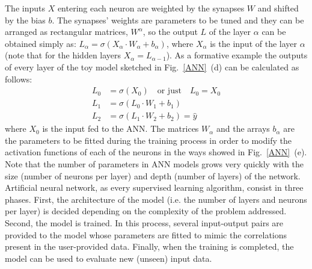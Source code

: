 The inputs $X$ entering each neuron are weighted by the synapses $W$ and shifted
by the bias $b$. The synapses' weights are parameters to be tuned and they can be
arranged as rectangular matrices, $W^{\alpha}$, so the output
$L$ of the layer $\alpha$ can be obtained simply as:
$L_\alpha=\sigma(X_\alpha\cdot W_\alpha + b_\alpha)$,
where $X_\alpha$ is the input of the layer $\alpha$ (note that for the hidden
layers $X_\alpha=L_{\alpha-1}$).
As a formative example the outputs of every layer of the toy model sketched in
Fig.~\ref{ANN}~(d) can be calculated as follows:
\begin{equation}
  \begin{split}
    L_0 &= \sigma(X_0) \quad\text{or just}\quad L_0 = X_0 \\
    L_1 &= \sigma\left(L_0 \cdot W_1 + b_1\right) \\
    L_2 &= \sigma\left(L_1\cdot W_2 + b_2\right)= \hat{y}
  \end{split}
\label{FF}
\end{equation}
where $X_0$ is the input fed to the ANN.
The matrices $W_\alpha$ and the arrays $b_\alpha$ are the parameters to be
fitted during the training process in order to modify the activation functions
of each of the neurons in the ways showed in Fig.~\ref{ANN}~(e). Note that the
number of parameters in ANN models grows very quickly with the size (number of
neurons per layer) and depth (number of layers) of the network.\\


Artificial neural network, as every supervised learning algorithm, consist in
three phases.
First, the architecture of the model (i.e. the number of layers and neurons per
layer) is decided depending on the complexity of the problem addressed.
Second, the model is trained. In this process, several input-output pairs are
provided to the model whose parameters are fitted to mimic the correlations
present in the user-provided data.
Finally, when the training is completed, the model can be used to evaluate new
(unseen) input data.


